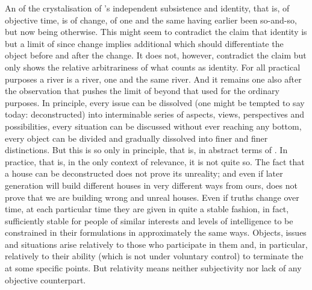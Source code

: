 \pa An  of the crystalisation of 's independent
subsistence 
and identity, that is, of objective time, is  of change, of
one and the same  having earlier been so-and-so, but now being
otherwise.  This might seem to contradict the claim that identity is but a
limit of  since change implies additional 
which should differentiate the object before and after the change.  It does not,
however, contradict the claim but only shows the relative arbitrariness of what
counts as identity. For all practical purposes a river is a river, one and the
same river. And it remains one also after the observation that  pushes the limit of  beyond that used for the ordinary
purposes. In principle, every issue can be dissolved (one might be tempted to say
today: deconstructed) into interminable series of aspects, views, perspectives
and possibilities, every situation can be discussed  without
ever reaching any bottom, every object can be divided and gradually dissolved
into finer and finer distinctions. But this is so only in principle, that is, in
abstract terms of . In practice, that is, in the only
context of relevance, it is not quite so. 
The fact that a house can be deconstructed does not prove its unreality; and
even if later generation will build different houses in very different ways from
ours, does not prove that we are building wrong and unreal houses. Even if
 truths change over time, at each particular time they are given in
quite a stable fashion, in fact, sufficiently stable for people of similar
interests and levels of intelligence to be constrained in their formulations in
approximately the same ways. Objects, issues and situations arise relatively to those
who participate in them and, in particular, relatively to their ability (which
is not under voluntary control) to terminate the  at some
specific points. But relativity means neither subjectivity nor lack of any
objective counterpart.

